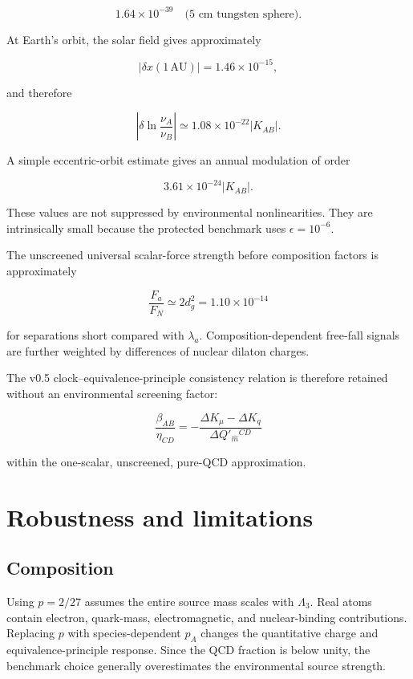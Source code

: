 \documentclass[11pt,a4paper]{article}
\begin{document}
\[
1.64\times10^{-39}
\quad\text{(5 cm tungsten sphere)}.
\]

At Earth's orbit, the solar field gives approximately

\[
|\delta x(1\,\mathrm{AU})|
=1.46\times10^{-15},
\]

and therefore

\[
\left|\delta\ln\frac{\nu_A}{\nu_B}\right|
\simeq
1.08\times10^{-22}|K_{AB}|.
\]

A simple eccentric-orbit estimate gives an annual modulation of order

\[
3.61\times10^{-24}|K_{AB}|.
\]

These values are not suppressed by environmental nonlinearities. They
are intrinsically small because the protected benchmark uses
\(\epsilon=10^{-6}\).

The unscreened universal scalar-force strength before composition
factors is approximately

\[
\frac{F_a}{F_N}\simeq2d_g^2
=1.10\times10^{-14}
\]

for separations short compared with \(\lambda_a\). Composition-dependent
free-fall signals are further weighted by differences of nuclear dilaton
charges.

The v0.5 clock--equivalence-principle consistency relation is therefore
retained without an environmental screening factor:

\[
\frac{\beta_{AB}}{\eta_{CD}}
=
-
\frac{\Delta K_\mu-\Delta K_q}
{\Delta Q'_{\widehat m}{}^{CD}}
\]

within the one-scalar, unscreened, pure-QCD approximation.



\section{Robustness and
limitations}\label{robustness-and-limitations}

\subsection{Composition}\label{composition}

Using \(p=2/27\) assumes the entire source mass scales with
\(\Lambda_3\). Real atoms contain electron, quark-mass, electromagnetic,
and nuclear-binding contributions. Replacing \(p\) with
species-dependent \(p_A\) changes the quantitative charge and
equivalence-principle response. Since the QCD fraction is below unity,
the benchmark choice generally overestimates the environmental source
strength.
\end{document}
